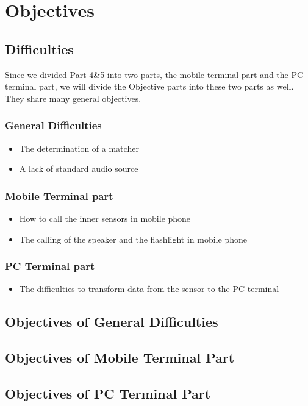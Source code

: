 \section{Objectives}
\subsection{Difficulties}
\hspace*{2em}Since we divided Part 4\&5 into two parts, the mobile terminal part and the PC terminal part, we will divide the Objective parts into these two parts as well. They share many general objectives. 

\subsubsection{General Difficulties }
\begin{itemize}
\item The determination of a matcher
\item A lack of standard audio source
\end{itemize}

\subsubsection{Mobile Terminal part}
\begin{itemize}
\item How to call the inner sensors in mobile phone
\item The calling of the speaker and the flashlight in mobile phone
\end{itemize}

\subsubsection{PC Terminal part}
\begin{itemize}
\item The difficulties to transform data from the sensor to the PC terminal
\end{itemize}



\subsection{Objectives of General Difficulties}
\subsection{Objectives of Mobile Terminal Part}
\subsection{Objectives of PC Terminal Part}
